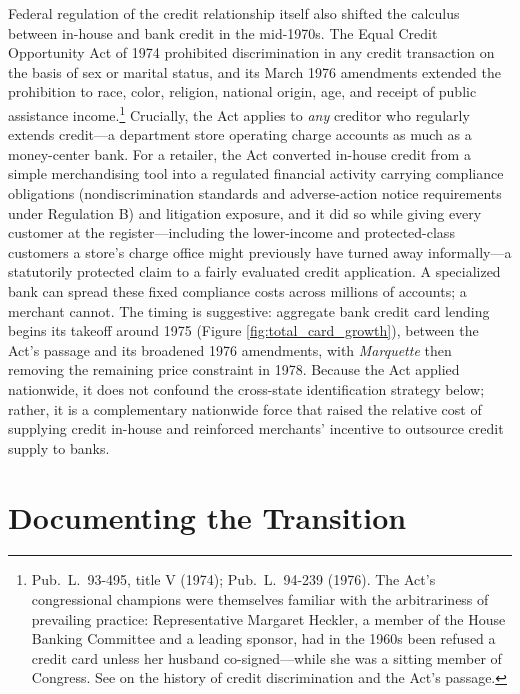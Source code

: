 \documentclass[12pt,english]{article}
\begin{document}
Federal regulation of the credit relationship itself also shifted the calculus between in-house and bank credit in the mid-1970s. The Equal Credit Opportunity Act of 1974 prohibited discrimination in any credit transaction on the basis of sex or marital status, and its March 1976 amendments extended the prohibition to race, color, religion, national origin, age, and receipt of public assistance income.\footnote{Pub.\ L.\ 93-495, title V (1974); Pub.\ L.\ 94-239 (1976). The Act's congressional champions were themselves familiar with the arbitrariness of prevailing practice: Representative Margaret Heckler, a member of the House Banking Committee and a leading sponsor, had in the 1960s been refused a credit card unless her husband co-signed---while she was a sitting member of Congress. See \cite{hyman_debtor_2012} on the history of credit discrimination and the Act's passage.} Crucially, the Act applies to \emph{any} creditor who regularly extends credit---a department store operating charge accounts as much as a money-center bank. For a retailer, the Act converted in-house credit from a simple merchandising tool into a regulated financial activity carrying compliance obligations (nondiscrimination standards and adverse-action notice requirements under Regulation B) and litigation exposure, and it did so while giving every customer at the register---including the lower-income and protected-class customers a store's charge office might previously have turned away informally---a statutorily protected claim to a fairly evaluated credit application. A specialized bank can spread these fixed compliance costs across millions of accounts; a merchant cannot. The timing is suggestive: aggregate bank credit card lending begins its takeoff around 1975 (Figure \ref{fig:total_card_growth}), between the Act's passage and its broadened 1976 amendments, with \emph{Marquette} then removing the remaining price constraint in 1978. Because the Act applied nationwide, it does not confound the cross-state identification strategy below; rather, it is a complementary nationwide force that raised the relative cost of supplying credit in-house and reinforced merchants' incentive to outsource credit supply to banks.


\section{Documenting the Transition}\label{sec:trends}
\end{document}
